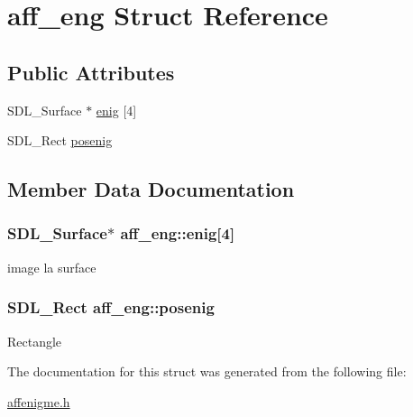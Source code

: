 \hypertarget{structaff__eng}{\section{aff\-\_\-eng Struct Reference}
\label{structaff__eng}
}
\subsection*{Public Attributes}
\begin{DoxyCompactItemize}
\item 
S\-D\-L\-\_\-\-Surface $\ast$ \hyperlink{structaff__eng_a599bf4104d6f3bf56ca3f6990cada0f7}{enig} \mbox{[}4\mbox{]}
\item 
S\-D\-L\-\_\-\-Rect \hyperlink{structaff__eng_a5d4544ba3f81d03ec75294551f654d76}{posenig}
\end{DoxyCompactItemize}


\subsection{Member Data Documentation}
\hypertarget{structaff__eng_a599bf4104d6f3bf56ca3f6990cada0f7}{
\subsubsection[{enig}]{\setlength{\rightskip}{0pt plus 5cm}S\-D\-L\-\_\-\-Surface$\ast$ aff\-\_\-eng\-::enig\mbox{[}4\mbox{]}}}\label{structaff__eng_a599bf4104d6f3bf56ca3f6990cada0f7}
image la surface \hypertarget{structaff__eng_a5d4544ba3f81d03ec75294551f654d76}{
\subsubsection[{posenig}]{\setlength{\rightskip}{0pt plus 5cm}S\-D\-L\-\_\-\-Rect aff\-\_\-eng\-::posenig}}\label{structaff__eng_a5d4544ba3f81d03ec75294551f654d76}
Rectangle 

The documentation for this struct was generated from the following file\-:\begin{DoxyCompactItemize}
\item 
\hyperlink{affenigme_8h}{affenigme.\-h}\end{DoxyCompactItemize}
